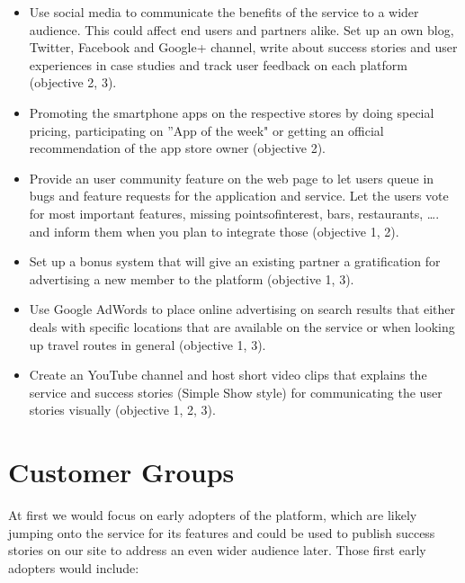 \documentclass[a4paper]{article}
\begin{document}
\begin{itemize}

\item  Use social media to communicate the benefits of the service to a wider audience. This could affect end users and partners alike. Set up an own blog, Twitter, Facebook and Google+ channel, write about success stories and user experiences in case studies and track user feedback on each platform (objective 2, 3).

\item  Promoting the smartphone apps on the respective stores by doing special pricing, participating on ''App of the week" or getting an official recommendation of the app store owner (objective 2).

\item  Provide an user community feature on the web page to let users queue in bugs and feature requests for the application and service. Let the users vote for most important features, missing points­of­interest, bars, restaurants, …. and inform them when you plan to integrate those (objective 1, 2).

\item Set up a bonus system that will give an existing partner a gratification for advertising a new member to the platform (objective 1, 3).

\item  Use Google AdWords to place online advertising on search results that either deals with specific locations that are available on the service or when looking up travel routes in general (objective 1, 3).

\item  Create an YouTube channel and host short video clips that explains the service and success stories (Simple Show style) for communicating the user stories visually (objective 1, 2, 3).

\end{itemize}


\section{Customer Groups} %
\label{sec:segmentation}

At first we would focus on early adopters of the platform, which are likely jumping onto the service for its features and could be used to publish success stories on our site to address an even wider audience later. Those first early adopters would include:
\end{document}
